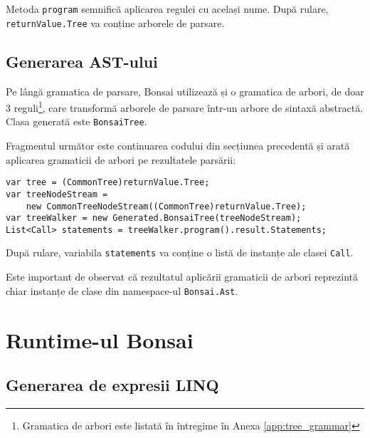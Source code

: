\documentclass[12pt,a4paper]{memoir}
\begin{document}
Metoda \texttt{program} semnifică aplicarea regulei cu același nume. După rulare, \texttt{returnValue.Tree} va conține arborele de parsare.

\section{Generarea AST-ului}

Pe lângă gramatica de parsare, Bonsai utilizează și o gramatica de arbori, de doar 3 reguli\footnote{Gramatica de arbori este listată în întregime în Anexa \ref{app:tree_grammar}}, care transformă arborele de parsare într-un arbore de sintaxă abstractă. Clasa generată este \texttt{BonsaiTree}.

Fragmentul următor este continuarea codului din secțiunea precedentă și arată aplicarea gramaticii de arbori pe rezultatele parsării:

\begin{Verbatim}
var tree = (CommonTree)returnValue.Tree;
var treeNodeStream = 
    new CommonTreeNodeStream((CommonTree)returnValue.Tree);
var treeWalker = new Generated.BonsaiTree(treeNodeStream);
List<Call> statements = treeWalker.program().result.Statements;
\end{Verbatim}

După rulare, variabila \texttt{statements} va conține o listă de instanțe ale clasei \texttt{Call}.

Este important de observat că rezultatul aplicării gramaticii de arbori reprezintă chiar instanțe de clase din namespace-ul \texttt{Bonsai.Ast}. 

\chapter{Runtime-ul Bonsai}

\section{}

\section{Generarea de expresii LINQ}

\end{document}
